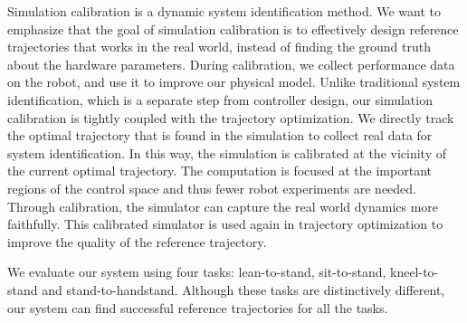 
Simulation calibration is a dynamic system identification method. We want to emphasize that the goal of simulation calibration is to effectively design reference trajectories that works in the real world, instead of finding the ground truth about the hardware parameters. During calibration, we collect performance data on the robot, and use it to improve our physical model. Unlike traditional system identification, which is a separate step from controller design, our simulation calibration is tightly coupled with the trajectory optimization. We directly track the optimal trajectory that is found in the simulation to collect real data for system identification. In this way, the simulation is calibrated at the vicinity of the current optimal trajectory. The computation is focused at the important regions of the control space and thus fewer robot experiments are needed. Through calibration, the simulator can capture the real world dynamics more faithfully. This calibrated simulator is used again in trajectory optimization to improve the quality of the reference trajectory.

We evaluate our system using four tasks: lean-to-stand, sit-to-stand, kneel-to-stand and stand-to-handstand. Although these tasks are distinctively different, our system can find successful reference trajectories for all the tasks.


